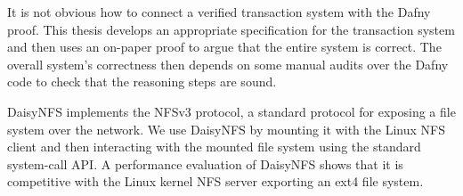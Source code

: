 It is not obvious how to connect a verified transaction system with the
Dafny proof. This thesis develops an appropriate specification for the
transaction system and then uses an on-paper proof to argue that the
entire system is correct. The overall system's correctness then depends
on some manual audits over the Dafny code to check that the reasoning
steps are sound.

DaisyNFS implements the NFSv3 protocol, a standard protocol for exposing
a file system over the network. We use DaisyNFS by mounting it with the
Linux NFS client and then interacting with the mounted file system using
the standard system-call API. A performance evaluation of DaisyNFS shows
that it is competitive with the Linux kernel NFS server exporting an
ext4 file system.
